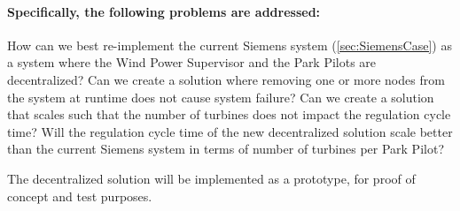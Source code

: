 \paragraph{Specifically, the following problems are addressed:}
\begin{description} %
	 How can we best re-implement the current Siemens system (\cref{sec:SiemensCase}) as a system where the Wind Power Supervisor and the Park Pilots are decentralized?
	 Can we create a solution where removing one or more nodes from the system at runtime does not cause system failure?
	 Can we create a solution that scales such that the number of turbines does not impact the regulation cycle time?
	 Will the regulation cycle time of the new decentralized solution scale better than the current Siemens system in terms of number of turbines per Park Pilot?
	
	
	

\end{description}

The decentralized solution will be implemented as a prototype, for proof of concept and test purposes.

